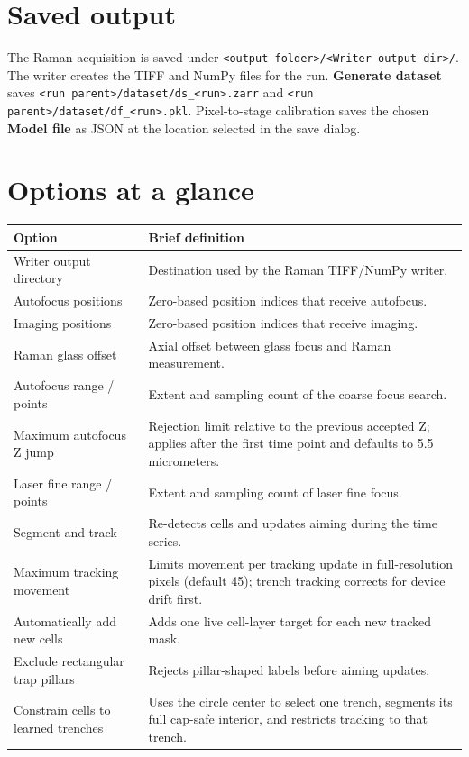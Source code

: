 \documentclass[11pt,oneside]{report}
\newcommand{\ui}[1]{\textbf{#1}}
\newcommand{\code}[1]{\texttt{#1}}
\begin{document}
\section*{Saved output}
The Raman acquisition is saved under
\code{<output folder>/<Writer output dir>/}. The writer creates the TIFF and NumPy
files for the run. \ui{Generate dataset} saves
\code{<run parent>/dataset/ds\_<run>.zarr} and
\code{<run parent>/dataset/df\_<run>.pkl}. Pixel-to-stage calibration saves the
chosen \ui{Model file} as JSON at the location selected in the save dialog.

\section*{Options at a glance}
\begin{longtable}{@{}p{}p{}@{}}
\toprule\textbf{Option} & \textbf{Brief definition}\\\midrule
Writer output directory & Destination used by the Raman TIFF/NumPy writer.\\
Autofocus positions & Zero-based position indices that receive autofocus.\\
Imaging positions & Zero-based position indices that receive imaging.\\
Raman glass offset & Axial offset between glass focus and Raman measurement.\\
Autofocus range / points & Extent and sampling count of the coarse focus search.\\
Maximum autofocus Z jump & Rejection limit relative to the previous accepted Z;
applies after the first time point and defaults to 5.5 micrometers.\\
Laser fine range / points & Extent and sampling count of laser fine focus.\\
Segment and track & Re-detects cells and updates aiming during the time series.\\
Maximum tracking movement & Limits movement per tracking update in full-resolution
pixels (default 45); trench tracking corrects for device drift first.\\
Automatically add new cells & Adds one live cell-layer target for each new tracked mask.\\
Exclude rectangular trap pillars & Rejects pillar-shaped labels before aiming updates.\\
Constrain cells to learned trenches & Uses the circle center to select one trench,
segments its full cap-safe interior, and restricts tracking to that trench.\\

\end{longtable}
\end{document}
